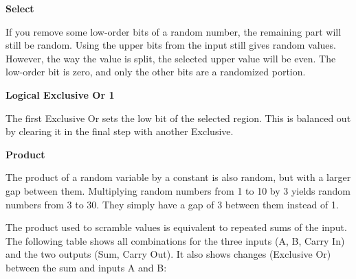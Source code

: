 \documentclass[preprint]{sigplanconf}
\begin{document}
\textbf{Select}

If you remove some low-order bits of a random number, the remaining part will still be random. Using the upper bits from the input still gives random values. However, the way the value is split, the selected upper value will be even. The low-order bit is zero, and only the other bits are a randomized portion.

\textbf{Logical Exclusive Or 1}

The first Exclusive Or sets the low bit of the selected region. This is balanced out by clearing it in the final step with another Exclusive.

\textbf{Product}

The product of a random variable by a constant is also random, but with a larger gap between them. Multiplying random numbers from 1 to 10 by 3 yields random numbers from 3 to 30. They simply have a gap of 3 between them instead of 1.

The product used to scramble values is equivalent to repeated sums of the input. The following table shows all combinations for the three inputs (A, B, Carry In) and the two outputs (Sum, Carry Out). It also shows changes (Exclusive Or) between the sum and inputs A and B:
\end{document}
